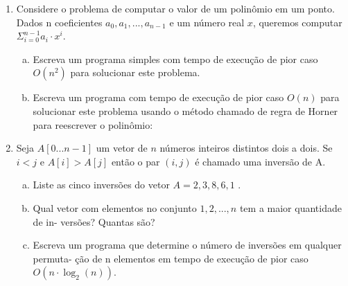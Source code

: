 \documentclass[a4paper,10pt]{article}
\begin{document}
\begin{enumerate}
\begin{center}
\end{center}

\item Considere o problema de computar o valor de um polinômio em um ponto. 
Dados n coeficientes $a_0 , a_1 , . . . , a_{n-1}$ e um número real $x$, queremos computar $\Sigma_{i=0}^{n-1} a_i \cdot x^i$.
  
  \begin{enumerate}[(a)]
\item Escreva um programa simples com tempo de execução de pior caso $O(n^2)$ para solucionar este problema.
\item Escreva um programa com tempo de execução de pior caso $O(n)$ para solucionar este problema 
usando o método chamado de regra de Horner para reescrever o polinômio:
  \end{enumerate}



\item Seja $A[0...n-1]$ um vetor de $n$ números inteiros distintos dois a dois. Se $i<j$ e $A[i]>A[j]$
então o par $(i,j)$ é chamado uma inversão de A.

  \begin{enumerate}[(a)]
\item Liste as cinco inversões do vetor $A = 2, 3, 8, 6, 1$ .
\item Qual vetor com elementos no conjunto ${1, 2, . . . , n}$ tem a maior quantidade de in-
versões? Quantas são?
\item Escreva um programa que determine o número de inversões em qualquer permuta-
ção de n elementos em tempo de execução de pior caso $O(n \cdot \log_2(n))$.
  \end{enumerate}
  
\end{enumerate} %
\end{document}

